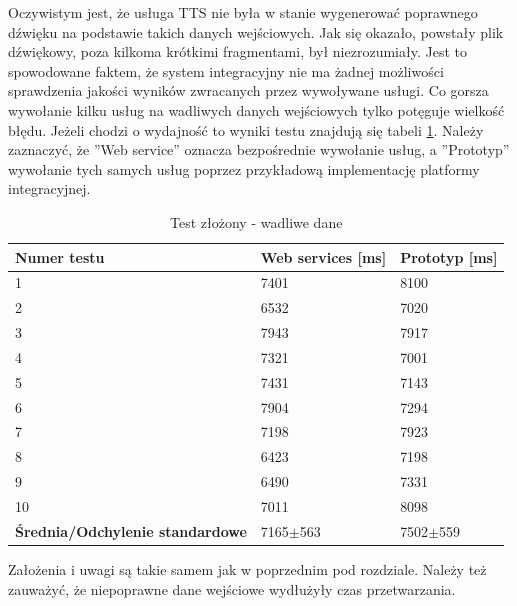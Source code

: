 Oczywistym jest, że usługa TTS nie była w stanie wygenerować poprawnego dźwięku na podstawie takich danych wejściowych. Jak się okazało, powstały plik dźwiękowy, poza kilkoma krótkimi fragmentami, był niezrozumiały. Jest to spowodowane faktem, że system integracyjny nie ma żadnej możliwości sprawdzenia jakości wyników zwracanych przez wywoływane usługi. Co gorsza wywołanie kilku usług na wadliwych danych wejściowych tylko potęguje wielkość błędu. Jeżeli chodzi o wydajność to wyniki testu znajdują się tabeli \ref{tab:brokenTestResults}. Należy zaznaczyć, że ''Web service'' oznacza bezpośrednie wywołanie usług, a ''Prototyp'' wywołanie tych samych usług poprzez przykładową implementację platformy integracyjnej. 
\newpage
\begin{center}
	\begin{table}[h]
	\caption{Test złożony - wadliwe dane}
	\label{tab:brokenTestResults}
	\centering
	\begin{tabular}{| l | l | l |}	
		\hline
		\textbf{Numer testu} & \textbf{Web services [ms]} & \textbf{Prototyp [ms]} \\ \hline
		1 & 7401 & 8100\\ \hline
		2 & 6532 & 7020\\ \hline
		3 & 7943 & 7917\\ \hline
		4 & 7321 & 7001\\ \hline
		5 & 7431 & 7143\\ \hline
		6 & 7904 & 7294\\ \hline
		7 & 7198 & 7923\\ \hline
		8 & 6423 & 7198\\ \hline
		9 & 6490 & 7331\\ \hline
		10 & 7011 & 8098\\ \hline
		\textbf{Średnia/Odchylenie standardowe} & 7165$\pm$563 & 7502$\pm$559\\ 
		\hline
	\end{tabular}
	\end{table}
\end{center}
Założenia i uwagi są takie samem jak w poprzednim pod rozdziale. Należy też zauważyć, że niepoprawne dane wejściowe wydłużyły czas przetwarzania.

